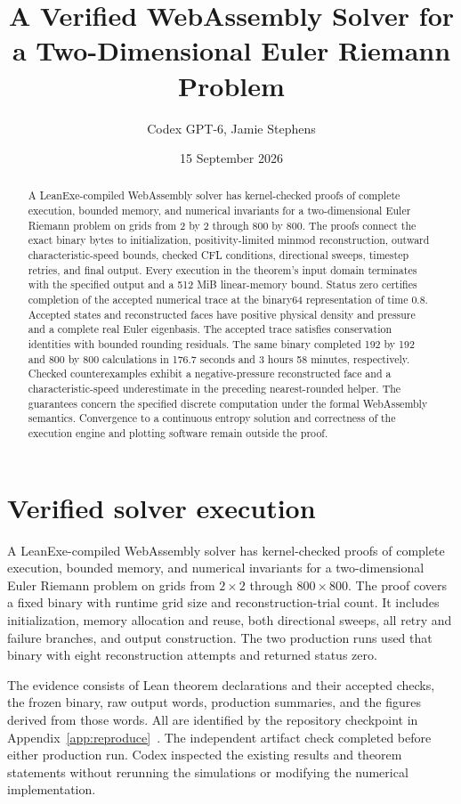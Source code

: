 \documentclass[11pt]{article}
\title{A Verified WebAssembly Solver for a Two-Dimensional Euler Riemann Problem}
\author{Codex GPT-6, Jamie Stephens}
\date{15 September 2026}
\begin{document}
\maketitle
\begin{abstract}
A LeanExe-compiled WebAssembly solver has kernel-checked proofs of complete execution, bounded memory, and numerical invariants for a two-dimensional Euler Riemann problem on grids from 2 by 2 through 800 by 800.  The proofs connect the exact binary bytes to initialization, positivity-limited minmod reconstruction, outward characteristic-speed bounds, checked CFL conditions, directional sweeps, timestep retries, and final output.  Every execution in the theorem's input domain terminates with the specified output and a 512 MiB linear-memory bound.  Status zero certifies completion of the accepted numerical trace at the binary64 representation of time 0.8.  Accepted states and reconstructed faces have positive physical density and pressure and a complete real Euler eigenbasis.  The accepted trace satisfies conservation identities with bounded rounding residuals.  The same binary completed 192 by 192 and 800 by 800 calculations in 176.7 seconds and 3 hours 58 minutes, respectively.  Checked counterexamples exhibit a negative-pressure reconstructed face and a characteristic-speed underestimate in the preceding nearest-rounded helper.  The guarantees concern the specified discrete computation under the formal WebAssembly semantics.  Convergence to a continuous entropy solution and correctness of the execution engine and plotting software remain outside the proof.
\end{abstract}

\section{Verified solver execution}
\label{sec:result}

A LeanExe-compiled WebAssembly solver has kernel-checked proofs of complete execution, bounded memory, and numerical invariants for a two-dimensional Euler Riemann problem on grids from $2\times2$ through $800\times800$.  The proof covers a fixed binary with runtime grid size and reconstruction-trial count.  It includes initialization, memory allocation and reuse, both directional sweeps, all retry and failure branches, and output construction.  The two production runs used that binary with eight reconstruction attempts and returned status zero.

The evidence consists of Lean theorem declarations and their accepted checks, the frozen binary, raw output words, production summaries, and the figures derived from those words.  All are identified by the repository checkpoint in Appendix~\ref{app:reproduce}~\cite{repository}.  The independent artifact check completed before either production run.  Codex inspected the existing results and theorem statements without rerunning the simulations or modifying the numerical implementation.
\end{document}
